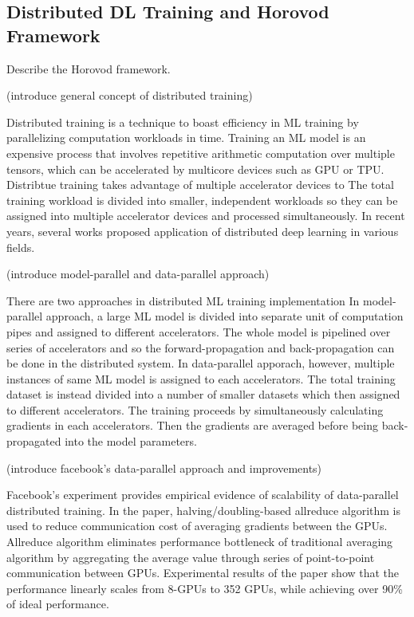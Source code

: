 \subsection{Distributed DL Training and Horovod Framework}
Describe the Horovod framework.

(introduce general concept of distributed training)

Distributed training is a technique to boast efficiency in ML training
by parallelizing computation workloads in time.
Training an ML model is an expensive process that involves repetitive
arithmetic computation over multiple tensors,
which can be accelerated by multicore devices such as GPU or TPU. 
Distribtue training takes advantage of multiple accelerator devices to
The total training workload is divided into smaller, independent workloads
so they can be assigned into multiple accelerator devices and
processed simultaneously. 
In recent years, several works proposed application of distributed
deep learning in various fields.

(introduce model-parallel and data-parallel approach\cite{approaches2019Mao})

There are two approaches in distributed ML training implementation
In model-parallel approach, a large ML model is divided into separate unit
of computation pipes and assigned to different accelerators. The whole model
is pipelined over series of accelerators and so the forward-propagation and
back-propagation can be done in the distributed system.
In data-parallel apporach, however, multiple instances of same ML model
is assigned to each accelerators. The total training dataset is instead
divided into a number of smaller datasets which then assigned to different
accelerators. The training proceeds by simultaneously calculating gradients
in each accelerators. Then the gradients are averaged before being 
back-propagated into the model parameters.

(introduce facebook's data-parallel approach and improvements)

Facebook's experiment \cite{facebook2018} provides empirical evidence of
scalability of data-parallel distributed training. In the paper, 
halving/doubling-based allreduce algorithm is used to reduce communication cost 
of averaging gradients between the GPUs. 
Allreduce algorithm eliminates performance bottleneck of traditional
averaging algorithm by aggregating the average value through series of
point-to-point communication between GPUs. 
Experimental results of the paper show that the performance linearly
scales from 8-GPUs to 352 GPUs, while achieving over 90\% of ideal performance.

